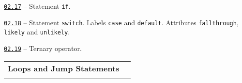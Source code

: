 \documentclass[a4paper,12pt]{article}
\renewenvironment{itemize}
{
    \begin{list}{\labelitemi}
    {
      \setlength{\topsep}{0pt}
      \setlength{\partopsep}{0pt}
      \setlength{\parskip}{0pt}
      \setlength{\itemsep}{0pt}
      \setlength{\parsep}{0pt}
      \setlength{\leftmargin}{14.5pt}
    }
}{\end{list}}
\begin{document}
\medskip\smallskip

\begin{itemize}

    \item \href{https://github.com/i-s-m-mipt/Education/blob/master/projects/examples/source/02.17.cpp}{\texttt{02.17}} -- Statement \lstinline{if}.

    \smallskip

    \item \href{https://github.com/i-s-m-mipt/Education/blob/master/projects/examples/source/02.18.cpp}{\texttt{02.18}} -- Statement \lstinline{switch}. Labels \lstinline{case} and \lstinline{default}. Attributes \lstinline{fallthrough}, \lstinline{likely} and \lstinline{unlikely}.

    \smallskip

    \item \href{https://github.com/i-s-m-mipt/Education/blob/master/projects/examples/source/02.19.cpp}{\texttt{02.19}} -- Ternary operator.

\end{itemize}

\bigskip\medskip

\begin{tabular}{!{\vrule width 1pt}L{5.7cm}!{\vrule width 1pt}L{13.3cm}!{\vrule width 0pt}} 


\textbf{Loops and Jump Statements} & \\


\end{tabular}

\medskip\smallskip
\end{document}
